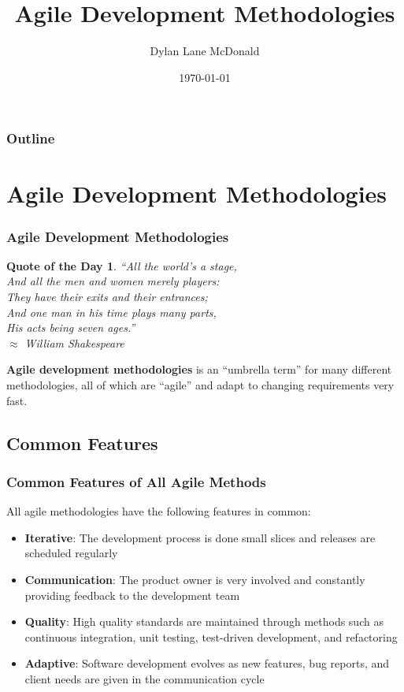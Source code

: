 \documentclass[aspectratio=169]{beamer}
\title{Agile Development Methodologies}
\author{Dylan Lane McDonald}
\institute{CNM STEMulus Center\\Web Development with PHP}
\date{\today}
\newtheorem{qotd}{Quote of the Day}
\begin{document}
\lstset{language=Java}
\begin{frame}
\titlepage
\end{frame}

\begin{frame}
\frametitle{Outline}
\tableofcontents
\end{frame}

\section{Agile Development Methodologies}
\begin{frame}
\frametitle{Agile Development Methodologies}
\begin{qotd}
``All the world's a stage,\\
And all the men and women merely players:\\
They have their exits and their entrances;\\
And one man in his time plays many parts,\\
His acts being seven ages.''\\
$\approx$ William Shakespeare
\end{qotd}
\pause
\textbf{Agile development methodologies} is an ``umbrella term'' for many different methodologies, all of which are ``agile'' and adapt to changing requirements very fast.
\end{frame}


\subsection{Common Features}
\begin{frame}
\frametitle{Common Features of All Agile Methods}
All agile methodologies have  the following features in common:
\begin{itemize}
	\item \textbf{Iterative}: The development process is done small slices and releases are scheduled regularly
	\item \textbf{Communication}: The product owner is very involved and constantly providing feedback to the development team
	\item \textbf{Quality}: High quality standards are maintained through methods such as continuous integration, unit testing, test-driven development, and refactoring
	\item \textbf{Adaptive}: Software development evolves as new features, bug reports, and client needs are given in the communication cycle  
\end{itemize}
\end{frame}
\end{document}
